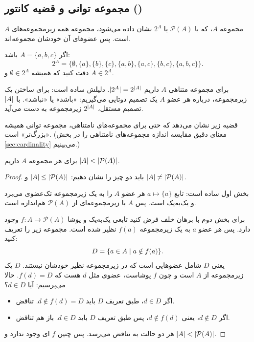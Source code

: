 \subsection{مجموعه توانی و قضیه کانتور ()}

\begin{definition}
 مجموعه $A$، که با $\mathcal{P}(A)$ یا $2^A$ نشان داده می‌شود، مجموعه همه زیرمجموعه‌های $A$ است. پس عضوهای آن خودشان مجموعه‌اند.
\end{definition}

\begin{example}
اگر $A=\{a,b,c\}$ باشد:
\[2^A=\big\{\emptyset,\{a\},\{b\},\{c\},\{a,b\},\{a,c\},\{b,c\},\{a,b,c\}\big\}.\]
دقت کنید که همیشه $\emptyset\in 2^A$ و $A\in 2^A$.
\end{example}

برای مجموعه متناهی $A$ داریم $\lvert 2^A\rvert=2^{\lvert A\rvert}$. دلیلش ساده است: برای ساختن یک زیرمجموعه، درباره هر عضو $A$ یک تصمیم دوتایی می‌گیریم: «باشد» یا «نباشد». با $\lvert A\rvert$ تصمیم مستقل، $2^{\lvert A\rvert}$ زیرمجموعه به دست می‌آید.

قضیه زیر نشان می‌دهد که حتی برای مجموعه‌های نامتناهی، مجموعه توانی همیشه «بزرگ‌تر» است. (معنای دقیق مقایسه اندازه مجموعه‌های نامتناهی را در بخش \ref{sec:cardinality} می‌بینیم.)

\begin{theorem}[کانتور]\label{thm:cantor}
برای هر مجموعه $A$ داریم $\lvert A\rvert<\lvert \mathcal{P}(A)\rvert$.
\end{theorem}

\begin{proof}
باید دو چیز را نشان دهیم: $\lvert A\rvert\le\lvert \mathcal{P}(A)\rvert$ و $\lvert A\rvert\neq\lvert \mathcal{P}(A)\rvert$.

بخش اول ساده است: تابع $a\mapsto\{a\}$ هر عضو $A$ را به یک زیرمجموعه تک‌عضوی می‌برد و یک‌به‌یک است. پس $A$ با زیرمجموعه‌ای از $\mathcal{P}(A)$ هم‌اندازه است.

برای بخش دوم با برهان خلف فرض کنید تابعی یک‌به‌یک و پوشا $f:A\to\mathcal{P}(A)$ وجود دارد. پس هر عضو $a$ به یک زیرمجموعه $f(a)$ نظیر شده است. مجموعه زیر را تعریف کنید:
\[D=\{a\in A\mid a\notin f(a)\}.\]
یعنی $D$ شامل عضوهایی است که در زیرمجموعه نظیر خودشان نیستند. $D$ یک زیرمجموعه از $A$ است و چون $f$ پوشاست، عضوی مثل $d$ هست که $f(d)=D$. حالا می‌پرسیم: آیا $d\in D$؟
\begin{itemize}
\item اگر $d\in D$، طبق تعریف $D$ باید $d\notin f(d)=D$. تناقض.
\item اگر $d\notin D$، یعنی $d\notin f(d)$، پس طبق تعریف $D$ باید $d\in D$. باز هم تناقض.
\end{itemize}
هر دو حالت به تناقض می‌رسد. پس چنین $f$ ای وجود ندارد و $\lvert A\rvert<\lvert \mathcal{P}(A)\rvert$.
\end{proof}

